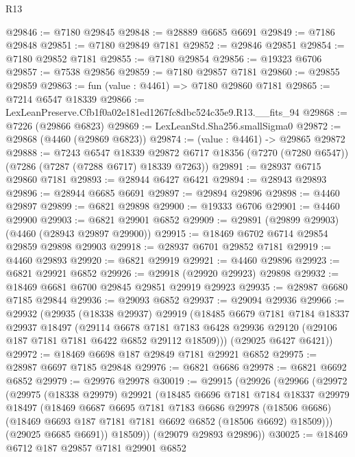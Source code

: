 \begin{lexlean}{R13}
\begin{coremodule}
@29846 := @7180 @29845
@29848 := @28889 @6685 @6691
@29849 := @7186 @29848
@29851 := @7180 @29849 @7181
@29852 := @29846 @29851
@29854 := @7180 @29852 @7181
@29855 := @7180 @29854
@29856 := @19323 @6706
@29857 := @7538 @29856
@29859 := @7180 @29857 @7181
@29860 := @29855 @29859
@29863 := fun (value : @4461) => @7180 @29860 @7181
@29865 := @7214 @6547 @18339
@29866 := LexLeanPreserve.Cfb1f0a02e181ed1267fc8dbc524c35e9.R13.__fits_94
@29868 := @7226 (@29866 @6823)
@29869 := LexLeanStd.Sha256.smallSigma0
@29872 := @29868 (@4460 (@29869 @6823))
@29874 := (value : @4461) -> @29865 @29872
@29888 := @7243
    @6547
    @18339
    @29872
    @6717
    @18356
    (@7270 (@7280 @6547))
    (@7286 (@7287 (@7288 @6717) @18339 @7263))
@29891 := @28937 @6715 @29860 @7181
@29893 := @28944 @6427 @6421
@29894 := @28943 @29893
@29896 := @28944 @6685 @6691
@29897 := @29894 @29896
@29898 := @4460 @29897
@29899 := @6821 @29898
@29900 := @19333 @6706
@29901 := @4460 @29900
@29903 := @6821 @29901 @6852
@29909 := @29891 (@29899 @29903) (@4460 (@28943 @29897 @29900))
@29915 := @18469 @6702 @6714 @29854 @29859 @29898 @29903
@29918 := @28937 @6701 @29852 @7181
@29919 := @4460 @29893
@29920 := @6821 @29919
@29921 := @4460 @29896
@29923 := @6821 @29921 @6852
@29926 := @29918 (@29920 @29923) @29898
@29932 := @18469 @6681 @6700 @29845 @29851 @29919 @29923
@29935 := @28987 @6680 @7185 @29844
@29936 := @29093 @6852
@29937 := @29094 @29936
@29966 := @29932
    (@29935
      (@18338 @29937)
      @29919
      (@18485
        @6679
        @7181
        @7184
        @18337
        @29937
        @18497
        (@29114
          @6678
          @7181
          @7183
          @6428
          @29936
          @29120
          (@29106 @187 @7181 @7181 @6422 @6852 @29112 @18509)))
      (@29025 @6427 @6421))
@29972 := @18469 @6698 @187 @29849 @7181 @29921 @6852
@29975 := @28987 @6697 @7185 @29848
@29976 := @6821 @6686
@29978 := @6821 @6692 @6852
@29979 := @29976 @29978
@30019 := @29915
    (@29926
      (@29966
        (@29972
          (@29975
            (@18338 @29979)
            @29921
            (@18485
              @6696
              @7181
              @7184
              @18337
              @29979
              @18497
              (@18469
                @6687
                @6695
                @7181
                @7183
                @6686
                @29978
                (@18506 @6686)
                (@18469 @6693 @187 @7181 @7181 @6692 @6852 (@18506 @6692) @18509)))
            (@29025 @6685 @6691))
          @18509))
      (@29079 @29893 @29896))
@30025 := @18469 @6712 @187 @29857 @7181 @29901 @6852

\end{coremodule}
\end{lexlean}
